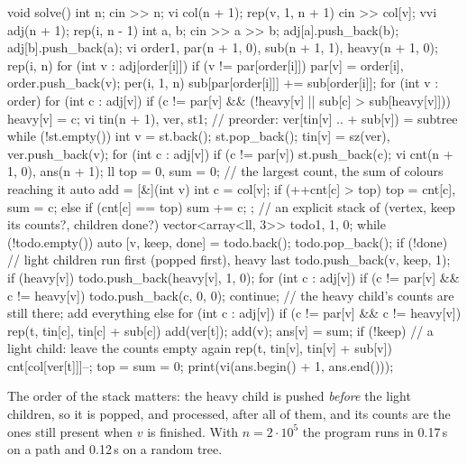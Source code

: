 \begin{code}
void solve() {
    int n;
    cin >> n;
    vi col(n + 1);
    rep(v, 1, n + 1) cin >> col[v];
    vvi adj(n + 1);
    rep(i, n - 1) {
        int a, b;
        cin >> a >> b;
        adj[a].push_back(b);
        adj[b].push_back(a);
    }
    vi order{1}, par(n + 1, 0), sub(n + 1, 1), heavy(n + 1, 0);
    rep(i, n) for (int v : adj[order[i]])
        if (v != par[order[i]]) par[v] = order[i], order.push_back(v);
    per(i, 1, n) sub[par[order[i]]] += sub[order[i]];
    for (int v : order)
        for (int c : adj[v])
            if (c != par[v] && (!heavy[v] || sub[c] > sub[heavy[v]]))
                heavy[v] = c;
    vi tin(n + 1), ver, st{1};  // preorder: ver[tin[v] .. + sub[v]) = subtree
    while (!st.empty()) {
        int v = st.back();
        st.pop_back();
        tin[v] = sz(ver), ver.push_back(v);
        for (int c : adj[v])
            if (c != par[v]) st.push_back(c);
    }
    vi cnt(n + 1, 0), ans(n + 1);
    ll top = 0, sum = 0;  // the largest count, the sum of colours reaching it
    auto add = [&](int v) {
        int c = col[v];
        if (++cnt[c] > top) top = cnt[c], sum = c;
        else if (cnt[c] == top) sum += c;
    };
    // an explicit stack of (vertex, keep its counts?, children done?)
    vector<array<ll, 3>> todo{{1, 1, 0}};
    while (!todo.empty()) {
        auto [v, keep, done] = todo.back();
        todo.pop_back();
        if (!done) {  // light children run first (popped first), heavy last
            todo.push_back({v, keep, 1});
            if (heavy[v]) todo.push_back({heavy[v], 1, 0});
            for (int c : adj[v])
                if (c != par[v] && c != heavy[v]) todo.push_back({c, 0, 0});
            continue;
        }
        // the heavy child's counts are still there; add everything else
        for (int c : adj[v])
            if (c != par[v] && c != heavy[v])
                rep(t, tin[c], tin[c] + sub[c]) add(ver[t]);
        add(v);
        ans[v] = sum;
        if (!keep) {  // a light child: leave the counts empty again
            rep(t, tin[v], tin[v] + sub[v]) cnt[col[ver[t]]]--;
            top = sum = 0;
        }
    }
    print(vi(ans.begin() + 1, ans.end()));
}
\end{code}


The order of the stack matters: the heavy child is pushed \emph{before} the light children, so it is popped, and processed,
after all of them, and its counts are the ones still present when $v$ is finished. With $n = 2 \cdot 10^5$ the program runs in
0.17\,s on a path and 0.12\,s on a random tree.

